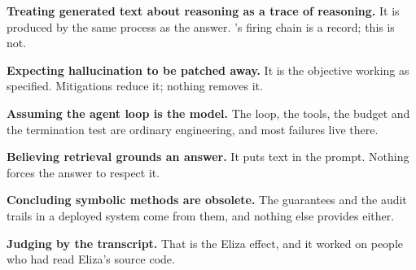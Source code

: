 \begin{pitfall}
\begin{tight}
  \item \textbf{Treating generated text about reasoning as a trace of reasoning.}
        It is produced by the same process as the answer. 's firing
        chain is a record; this is not.
  \item \textbf{Expecting hallucination to be patched away.} It is the objective
        working as specified. Mitigations reduce it; nothing removes it.
  \item \textbf{Assuming the agent loop is the model.} The loop, the tools, the
        budget and the termination test are ordinary engineering, and most failures
        live there.
  \item \textbf{Believing retrieval grounds an answer.} It puts text in the prompt.
        Nothing forces the answer to respect it.
  \item \textbf{Concluding symbolic methods are obsolete.} The guarantees and the
        audit trails in a deployed system come from them, and nothing else provides
        either.
  \item \textbf{Judging by the transcript.} That is the Eliza effect, and it worked
        on people who had read Eliza's source code.
\end{tight}
\end{pitfall}


